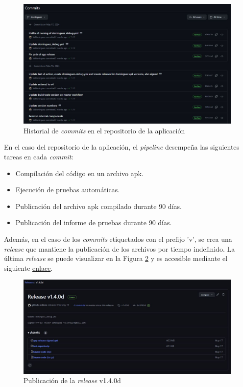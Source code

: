         \begin{figure}[h]
            \centering
            \includegraphics[width=1\textwidth]{figures/desarrollo/commits repo.JPG}
            \caption{Historial de \textit{commits} en el repositorio de la aplicación}
            \label{figure:desarrollo:historial_commits}
        \end{figure}

        En el caso del repositorio de la aplicación, el \textit{pipeline} desempeña las siguientes tareas en cada \textit{commit}:
        \begin{itemize}
            \item Compilación del código en un archivo \gls{apk}.
            \item Ejecución de pruebas automáticas.
            \item Publicación del archivo \gls{apk} compilado durante 90 días.
            \item Publicación del informe de pruebas durante 90 días.
        \end{itemize}

        Además, en el caso de los \textit{commits} etiquetados con el prefijo 'v', se crea una \textit{release} que mantiene la publicación de los archivos por tiempo indefinido. La última \textit{release} se puede visualizar en la Figura \ref{figure:desarrollo:ultima_release} y es accesible mediante el siguiente \href{https://github.com/Emotional-Wellbeing/App/releases/tag/v1.4.0d}{enlace}.

        \begin{figure}[h]
            \centering
            \includegraphics[width=1\textwidth]{figures/desarrollo/ultima release.JPG}
            \caption{Publicación de la \textit{release} v1.4.0d}
            \label{figure:desarrollo:ultima_release}
        \end{figure}
        
